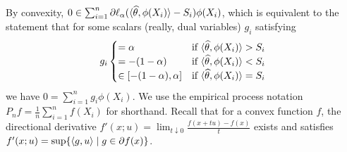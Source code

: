 \documentclass{article}
\newcommand{\loss}{\ell}
\newcommand{\scorerv}{S}
\begin{document}
By convexity,
$0 \in \sum_{i = 1}^n \partial \loss_\alpha(
\<\what{\theta}, \phi(X_i)\>
- \scorerv_i) \phi(X_i)$,
which is equivalent to the statement that for
some scalars (really, dual variables) $g_i$ satisfying
\begin{equation}
  \label{eqn:g-gradient-calcs}
  g_i \begin{cases}
    = \alpha & \mbox{if}~ \<\what{\theta}, \phi(X_i)\> > \scorerv_i \\
    = -(1 - \alpha) & \mbox{if}~ \<\what{\theta}, \phi(X_i)\> < \scorerv_i \\
    \in [-(1 - \alpha), \alpha]
    & \mbox{if}~ \<\what{\theta}, \phi(X_i)\> = \scorerv_i
  \end{cases}
\end{equation}
we have
$0 = \sum_{i = 1}^n g_i \phi(X_i)$.
%
We use the empirical process notation
$P_n f = \frac{1}{n} \sum_{i = 1}^n f(X_i)$ for shorthand.
%
Recall that for a convex function $f$, the directional
derivative $f'(x; u) = \lim_{t \downarrow 0} \frac{f(x + tu) - f(x)}{t}$
exists and satisfies $f'(x; u) = \sup\{\langle g, u\rangle \mid g \in \partial f(x)\}$.
\end{document}
